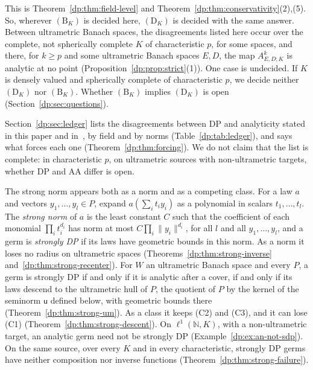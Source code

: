 \documentclass[11pt]{amsart}
\theoremstyle{definition}
\theoremstyle{remark}
\numberwithin{equation}{section}
\newcommand{\N}{\mathbb N}
\newcommand{\norm}[1]{\lVert #1\rVert}
\theoremstyle{plain}
\theoremstyle{definition}
\theoremstyle{plain}
\begin{document}
This is Theorem~\ref{dp:thm:field-level} and Theorem~\ref{dp:thm:conservativity}(2),(5). So, wherever $(\mathrm B_K)$ is decided here, $(\mathrm D_K)$ is decided with the same answer. Between ultrametric Banach spaces, the disagreements listed here occur over the complete, not spherically complete $K$ of characteristic $p$, for some spaces, and there, for $k\ge p$ and some ultrametric Banach spaces $E,D$, the map $A^k_{E,D;K}$ is analytic at no point (Proposition~\ref{dp:prop:strict}(1)). One case is undecided. If $K$ is densely valued and spherically complete of characteristic $p$, we decide neither $(\mathrm D_K)$ nor $(\mathrm B_K)$. Whether $(\mathrm B_K)$ implies $(\mathrm D_K)$ is open (Section~\ref{dp:sec:questions}).

Section~\ref{dp:sec:ledger} lists the disagreements between DP and analyticity stated in this paper and in~\cite{I}, by field and by norms (Table~\ref{dp:tab:ledger}), and says what forces each one (Theorem~\ref{dp:thm:forcing}). We do not claim that the list is complete: in characteristic $p$, on ultrametric sources with non-ultrametric targets, whether DP and AA differ is open.

The strong norm appears both as a norm and as a competing class. For a law $a$ and vectors $y_1,\dots,y_l\in P$, expand $a(\sum_it_iy_i)$ as a polynomial in scalars $t_1,\dots,t_l$. The \emph{strong norm} of $a$ is the least constant $C$ such that the coefficient of each monomial $\prod_it_i^{d_i}$ has norm at most $C\prod_i\norm{y_i}^{d_i}$, for all $l$ and all $y_1,\dots,y_l$, and a germ is \emph{strongly DP} if its laws have geometric bounds in this norm. As a norm it loses no radius on ultrametric spaces (Theorems~\ref{dp:thm:strong-inverse} and~\ref{dp:thm:strong-recenter}). For $W$ an ultrametric Banach space and every $P$, a germ is strongly DP if and only if it is analytic after a cover, if and only if its laws descend to the ultrametric hull of $P$, the quotient of $P$ by the kernel of the seminorm $\mathsf u$ defined below, with geometric bounds there (Theorem~\ref{dp:thm:strong-um}). As a class it keeps (C2) and (C3), and it can lose (C1) (Theorem~\ref{dp:thm:strong-descent}). On $\ell^1(\N,K)$, with a non-ultrametric target, an analytic germ need not be strongly DP (Example~\ref{dp:ex:an-not-sdp}). On the same source, over every $K$ and in every characteristic, strongly DP germs have neither composition nor inverse functions (Theorem~\ref{dp:thm:strong-failure}).
\end{document}
